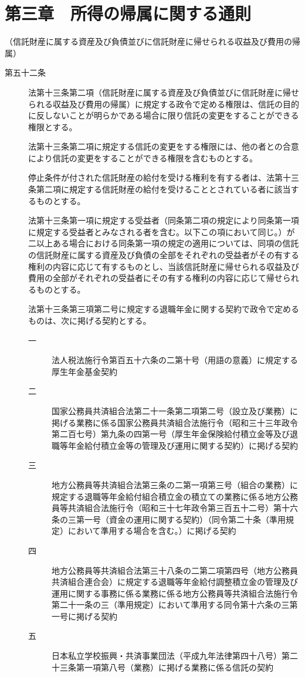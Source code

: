 \documentclass[twocolumn,a4j,10pt]{ltjtarticle}
\begin{document}
\section*{第三章　所得の帰属に関する通則}
\noindent\hspace{10pt}（信託財産に属する資産及び負債並びに信託財産に帰せられる収益及び費用の帰属）
\begin{description}
\item[第五十二条]法第十三条第二項（信託財産に属する資産及び負債並びに信託財産に帰せられる収益及び費用の帰属）に規定する政令で定める権限は、信託の目的に反しないことが明らかである場合に限り信託の変更をすることができる権限とする。
\item[]法第十三条第二項に規定する信託の変更をする権限には、他の者との合意により信託の変更をすることができる権限を含むものとする。
\item[]停止条件が付された信託財産の給付を受ける権利を有する者は、法第十三条第二項に規定する信託財産の給付を受けることとされている者に該当するものとする。
\item[]法第十三条第一項に規定する受益者（同条第二項の規定により同条第一項に規定する受益者とみなされる者を含む。以下この項において同じ。）が二以上ある場合における同条第一項の規定の適用については、同項の信託の信託財産に属する資産及び負債の全部をそれぞれの受益者がその有する権利の内容に応じて有するものとし、当該信託財産に帰せられる収益及び費用の全部がそれぞれの受益者にその有する権利の内容に応じて帰せられるものとする。
\item[]法第十三条第三項第二号に規定する退職年金に関する契約で政令で定めるものは、次に掲げる契約とする。
\begin{description}
\item[一]法人税法施行令第百五十六条の二第十号（用語の意義）に規定する厚生年金基金契約
\item[二]国家公務員共済組合法第二十一条第二項第二号（設立及び業務）に掲げる業務に係る国家公務員共済組合法施行令（昭和三十三年政令第二百七号）第九条の四第一号（厚生年金保険給付積立金等及び退職等年金給付積立金等の管理及び運用に関する契約）に掲げる契約
\item[三]地方公務員等共済組合法第三条の二第一項第三号（組合の業務）に規定する退職等年金給付組合積立金の積立ての業務に係る地方公務員等共済組合法施行令（昭和三十七年政令第三百五十二号）第十六条の三第一号（資金の運用に関する契約）（同令第二十条（準用規定）において準用する場合を含む。）に掲げる契約
\item[四]地方公務員等共済組合法第三十八条の二第二項第四号（地方公務員共済組合連合会）に規定する退職等年金給付調整積立金の管理及び運用に関する事務に係る業務に係る地方公務員等共済組合法施行令第二十一条の三（準用規定）において準用する同令第十六条の三第一号に掲げる契約
\item[五]日本私立学校振興・共済事業団法（平成九年法律第四十八号）第二十三条第一項第八号（業務）に掲げる業務に係る信託の契約
\end{description}
\end{description}
\end{document}
